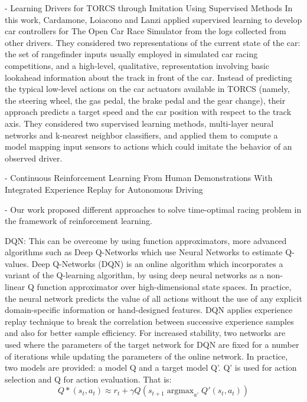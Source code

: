 - Learning Drivers for TORCS through Imitation Using Supervised Methods	
In this work, Cardamone, Loiacono and Lanzi applied supervised learning to develop car controllers for The Open Car Race Simulator from the logs collected from other drivers. 
They considered two representations of the current state of the car: the set of rangefinder inputs usually employed in simulated car racing competitions, and a high-level, qualitative, representation involving basic lookahead information about the track in front of the car. Instead of predicting the typical low-level actions on the car actuators available in TORCS (namely, the steering wheel, the gas pedal, the brake pedal and the gear change), their approach predicts a target speed and the car position with respect to the track axis.
They considered two supervised learning methods, multi-layer neural networks and k-nearest neighbor classifiers, and applied them to compute a model mapping input sensors to actions which could imitate the behavior of an observed driver.

- Continuous Reinforcement Learning From Human Demonstrations With Integrated Experience Replay for Autonomous Driving


- Our work proposed different approaches to solve time-optimal racing problem in the framework of reinforcement learning. 



DQN:
 This can be overcome by using function approximators, more advanced algorithms such as Deep Q-Networks which use Neural Networks to estimate Q-values. 
Deep Q-Networks (DQN) \cite{atari} is an online algorithm which incorporates a variant of the Q-learning algorithm, by using deep neural networks as a non-linear Q function approximator over high-dimensional state spaces. In practice, the neural network predicts the value of all actions without the use of any explicit domain-specific information or hand-designed features. DQN applies experience replay technique to break the correlation between successive experience samples and also for better sample efficiency. For increased stability, two networks are used where the parameters of the target network for DQN are fixed for a number of iterations while updating the parameters of the online network. 
In practice, two models are provided: a model Q and a target model Q’.  Q’ is used for action selection and Q for action evaluation. That is: \[Q*(s_t,a_t)\approx r_t + \gamma Q(s_{t+1} \operatorname{argmax}_{a'} Q' (s_t,a_t))\]

